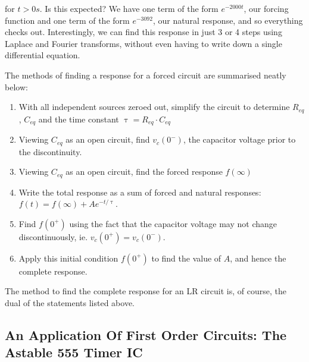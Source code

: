 \documentclass[11pt]{article}
\numberwithin{equation}{section}
\begin{document}
\begin{flushleft}
\begin{tcolorbox}[colback=green!5, colframe=green!75!black, title=\textbf{Example 2.3}, breakable]
for $t>0s$. Is this expected? We have one term of the form $e^{-2000t}$, our forcing function and one term of the form $e^{-3092}$, our natural
response, and so everything checks out. Interestingly, we can find this response in just 3 or 4 steps using Laplace and Fourier transforms, without
even having to write down a single differential equation.

\end{tcolorbox}

The methods of finding a response for a forced circuit are summarised neatly below:

\begin{tcolorbox}[arc=0mm]
 \begin{enumerate}
  \item With all independent sources zeroed out, simplify the circuit to determine $R_{eq}$, $C_{eq}$ and the time constant $\uptau=R_{eq}\cdot C_{eq}$
  \item Viewing $C_{eq}$ as an open circuit, find $v_c(0^-)$, the capacitor voltage prior to the discontinuity.
  \item Viewing $C_{eq}$ as an open circuit, find the forced response $f(\infty)$
  \item Write the total response as a sum of forced and natural responses: $f(t) = f(\infty)+Ae^{-t/\uptau}$.
  \item Find $f(0^+)$ using the fact that the capacitor voltage may not change discontinuously, ie. $v_c(0^+)=v_c(0^-)$.
  \item Apply this initial condition $f(0^+)$ to find the value of $A$, and hence the complete response.
 \end{enumerate}
\end{tcolorbox}

The method to find the complete response for an LR circuit is, of course, the dual of the statements listed above.

\color{blue}
\subsection{An Application Of First Order Circuits: The Astable 555 Timer IC}
\color{black}


\end{flushleft}
\end{document}
